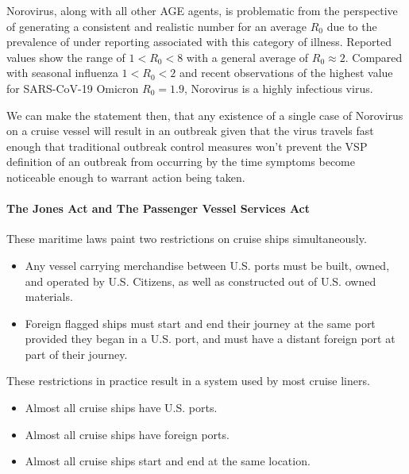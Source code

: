 \documentclass[
  11,
]{book}
\providecommand{\tightlist}{%
  \setlength{\itemsep}{0pt}\setlength{\parskip}{0pt}}
\begin{document}
Norovirus, along with all other AGE agents, is problematic from the perspective of generating a consistent and realistic number for an average \(R_0\) due to the prevalence of under reporting associated with this category of illness. Reported values show the range of \(1 < R_0 < 8\) with a general average of \(R_0 \approx 2\). Compared with seasonal influenza \(1 < R_0 < 2\) and recent observations of the highest value for SARS-CoV-19 Omicron \(R_0 = 1.9\), Norovirus is a highly infectious virus.

We can make the statement then, that any existence of a single case of Norovirus on a cruise vessel will result in an outbreak given that the virus travels fast enough that traditional outbreak control measures won't prevent the VSP definition of an outbreak from occurring by the time symptoms become noticeable enough to warrant action being taken.

\hypertarget{the-jones-act-and-the-passenger-vessel-services-act}{%
\paragraph*{The Jones Act and The Passenger Vessel Services Act}\label{the-jones-act-and-the-passenger-vessel-services-act}}

These maritime laws paint two restrictions on cruise ships simultaneously.

\begin{itemize}
\item
  Any vessel carrying merchandise between U.S. ports must be built, owned, and operated by U.S. Citizens, as well as constructed out of U.S. owned materials.
\item
  Foreign flagged ships must start and end their journey at the same port provided they began in a U.S. port, and must have a distant foreign port at part of their journey.
\end{itemize}

These restrictions in practice result in a system used by most cruise liners.

\begin{itemize}
\tightlist
\item
  Almost all cruise ships have U.S. ports.
\item
  Almost all cruise ships have foreign ports.
\item
  Almost all cruise ships start and end at the same location.
\end{itemize}
\end{document}
